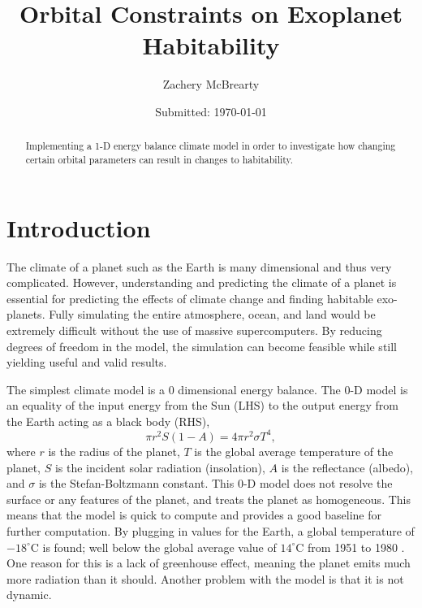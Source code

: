 \documentclass[12pt, onecolumn]{revtex4-2}    %
\begin{document}
\title{Orbital Constraints on Exoplanet Habitability}
\date{Submitted: \today{}}
\author{Zachery McBrearty}

\begin{abstract}

    Implementing a 1-D energy balance climate model in order to investigate how changing certain orbital parameters can result in changes to habitability.

\end{abstract}


\maketitle

\tableofcontents

\newpage

\section{Introduction}

The climate of a planet such as the Earth is many dimensional and thus very complicated.
However, understanding and predicting the climate of a planet is essential for predicting the effects of climate change and finding habitable exo-planets.
Fully simulating the entire atmosphere, ocean, and land would be extremely difficult without the use of massive supercomputers.
By reducing degrees of freedom in the model, the simulation can become feasible while still yielding useful and valid results.

The simplest climate model is a 0 dimensional energy balance.
The 0-D model is an equality of the input energy from the Sun (LHS) to the output energy from the Earth acting as a black body (RHS),
\begin{equation}
    \pi r^2 S(1-A) = 4 \pi r^2 \sigma T^4, \label{eq:0DEBCM}
\end{equation}
where $r$ is the radius of the planet, $T$ is the global average temperature of the planet, $S$ is the incident solar radiation (insolation), $A$ is the reflectance (albedo), and $\sigma$ is the Stefan-Boltzmann constant.
This 0-D model does not resolve the surface or any features of the planet, and treats the planet as homogeneous.
This means that the model is quick to compute and provides a good baseline for further computation.
By plugging in values for the Earth, a global temperature of $-18 ^{\circ}$C is found; well below the global average value of $14^{\circ}$C from 1951 to 1980 \cite{NASAGlobTemp}.
One reason for this is a lack of greenhouse effect, meaning the planet emits much more radiation than it should.
Another problem with the model is that it is not dynamic.
\end{document}
